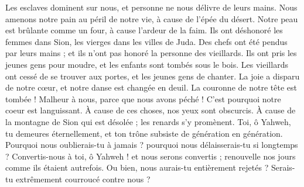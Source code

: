 \begin{multicols}{2}
Les esclaves dominent sur nous, et personne ne nous délivre de leurs mains.
Nous amenons notre pain au péril de notre vie, à cause de l'épée du désert.
Notre peau est brûlante comme un four, à cause l'ardeur de la faim.
Ils ont déshonoré les femmes dans Sion, les vierges dans les villes de Juda.
Des chefs ont été pendus par leurs mains ; et ils n'ont pas honoré la personne des vieillards.
Ils ont pris les jeunes gens pour moudre, et les enfants sont tombés sous le bois.
Les vieillards ont cessé de se trouver aux portes, et les jeunes gens de chanter.
La joie a disparu de notre cœur, et notre danse est changée en deuil.
La couronne de notre tête est tombée ! Malheur à nous, parce que nous avons péché !
C'est pourquoi notre coeur est languissant. À cause de ces choses, nos yeux sont obscurcis.
À cause de la montagne de Sion qui est désolée ; les renards s'y promènent.
Toi, ô Yahweh, tu demeures éternellement, et ton trône subsiste de génération en génération.
Pourquoi nous oublierais-tu à jamais ? pourquoi nous délaisserais-tu si longtemps ?
Convertis-nous à toi, ô Yahweh ! et nous serons convertis ; renouvelle nos jours comme ils étaient autrefois.
Ou bien, nous aurais-tu entièrement rejetés ? Serais-tu extrêmement courroucé contre nous ?
\PPE{}
\end{multicols}
